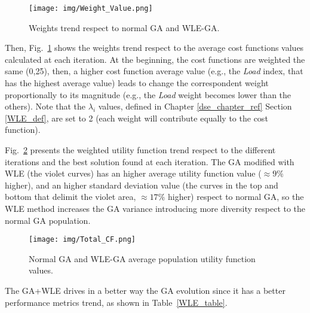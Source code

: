 % 
%
\begin{figure}[htbp]
	\centerline{\texttt{[image: img/Weight\_Value.png]}}
	\caption{Weights trend respect to normal GA and WLE-GA.}
	\label{weight_value}
\end{figure}
%
Then, Fig.~\ref{weight_value} shows the weights trend respect to the average cost functions values calculated at each iteration. At the beginning, the cost functions are weighted the same (0,25), then, a higher cost function average value (e.g., the \textit{Load} index, that has the highest average value) leads to change the correspondent weight proportionally to its magnitude (e.g., the \textit{Load} weight becomes lower than the others). Note that the $\lambda_{i}$ values, defined in Chapter \ref{dse_chapter_ref} Section \ref{WLE_def}, are set to 2 (each weight will contribute equally to the cost function). \par
Fig.~\ref{total_cf} presents the weighted utility function trend respect to the different iterations and the best solution found at each iteration. The GA modified with WLE (the violet curves) has an higher average utility function value ($\approx 9\%$ higher), and an higher standard deviation value (the curves in the top and bottom that delimit the violet area, $\approx 17\%$ higher) respect to normal GA, so the WLE method increases the GA variance introducing more diversity respect to the normal GA population. \par
%
\begin{figure}[htbp]
	\centerline{\texttt{[image: img/Total\_CF.png]}}
	\caption{Normal GA and WLE-GA average population utility function values.}
	\label{total_cf}
\end{figure}
%
The GA+WLE drives in a better way the GA evolution since it has a better performance metrics trend, as shown in Table~\ref{WLE_table}. \par
%
